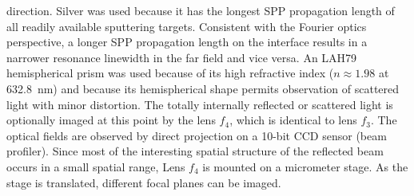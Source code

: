 direction.  Silver was used because it has the longest SPP propagation
length of all readily available sputtering targets.
Consistent with the Fourier optics perspective, a longer SPP propagation
length on the interface results in a narrower resonance linewidth in the
far field and vice versa.  An LAH79 hemispherical prism was used because of
its high refractive index ($n\approx 1.98$ at \SI{632.8}{\nano\meter}) and
because its hemispherical shape permits observation of scattered light with
minor distortion.  The totally internally reflected or scattered light is
optionally imaged at this point by the lens $f_4$, which is identical to
lens $f_3$.  The optical fields are observed by direct projection on a 10-bit
CCD sensor (beam profiler).  Since most of the interesting spatial structure of the
reflected beam occurs in a small spatial range, Lens $f_4$
is mounted on a micrometer stage.  As the stage is translated, different focal
planes can be imaged.

